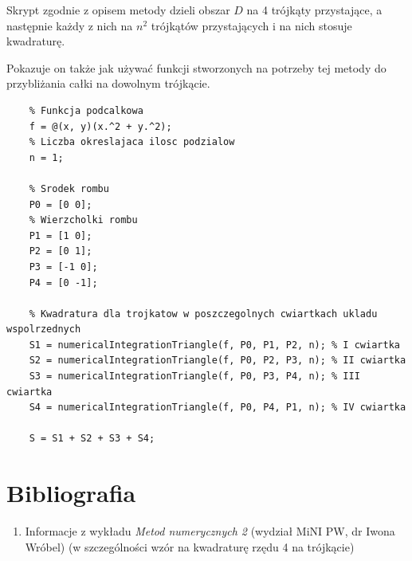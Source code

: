 \documentclass[12pt]{article}
\begin{document}
	Skrypt zgodnie z opisem metody dzieli obszar $D$ na 4 trójkąty przystające, a następnie każdy z nich na $n^2$ trójkątów przystających i na nich stosuje kwadraturę.
	
	Pokazuje on także jak używać funkcji stworzonych na potrzeby tej metody do przybliżania całki na dowolnym trójkącie.
	
	\begin{lstlisting}[frame=single]
	% Parametry:
	% Funkcja podcalkowa
	f = @(x, y)(x.^2 + y.^2);
	% Liczba okreslajaca ilosc podzialow
	n = 1;
	
	% Srodek rombu
	P0 = [0 0];
	% Wierzcholki rombu
	P1 = [1 0];
	P2 = [0 1];
	P3 = [-1 0];
	P4 = [0 -1];
	
	% Kwadratura dla trojkatow w poszczegolnych cwiartkach ukladu wspolrzednych
	S1 = numericalIntegrationTriangle(f, P0, P1, P2, n); % I cwiartka
	S2 = numericalIntegrationTriangle(f, P0, P2, P3, n); % II cwiartka
	S3 = numericalIntegrationTriangle(f, P0, P3, P4, n); % III cwiartka
	S4 = numericalIntegrationTriangle(f, P0, P4, P1, n); % IV cwiartka
	
	S = S1 + S2 + S3 + S4;
	\end{lstlisting}
	
	
	
	\section{Bibliografia}
	\begin{enumerate}
		\item Informacje z wykładu \textit{Metod numerycznych 2} (wydział MiNI PW, dr Iwona Wróbel) (w szczególności wzór na kwadraturę rzędu 4 na trójkącie)
	\end{enumerate}
	
\end{document}
